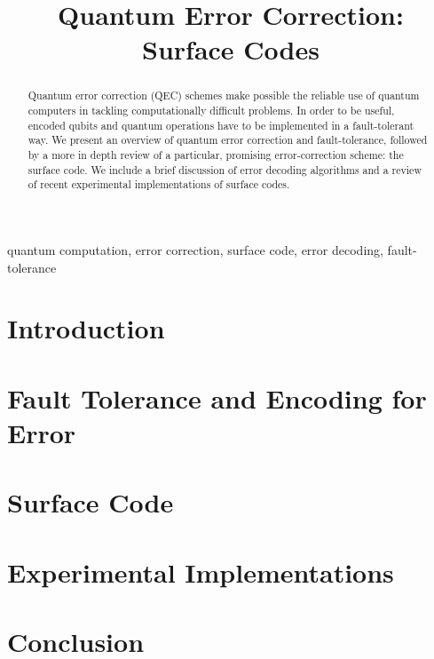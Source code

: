 \documentclass[conference]{IEEEtran}
\begin{document}
\title{Quantum Error Correction: Surface Codes}

\author{

  \and

}

\maketitle


\begin{abstract}
Quantum error correction (QEC) schemes make possible the reliable use of quantum computers in
tackling computationally difficult problems. In order to be useful, encoded
qubits and quantum operations have to be implemented in a fault-tolerant way. We
present an overview of quantum error correction and fault-tolerance, followed by
a more in depth review of a particular, promising error-correction scheme: the
surface code. We include a brief discussion of error decoding algorithms and a
review of recent experimental implementations of surface codes.
\end{abstract}

\begin{IEEEkeywords}
  quantum computation, error correction, surface code, error decoding, fault-tolerance
\end{IEEEkeywords}

\section{Introduction}


\section{Fault Tolerance and Encoding for Error}


\section{Surface Code}


\section{Experimental Implementations}


\section{Conclusion}


\pagebreak
\printbibliography
\end{document}
